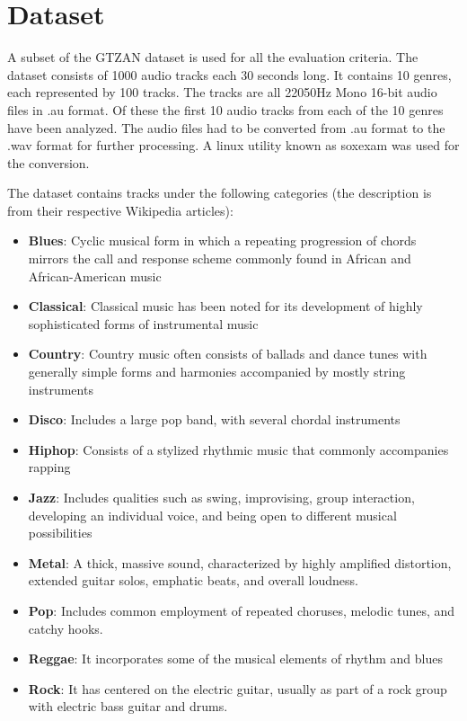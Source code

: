 \documentclass[12pt,journal,compsoc]{IEEEtran}
\begin{document}
\section{Dataset}
A subset of the GTZAN dataset \cite{gtzan} is used for all the evaluation criteria. The dataset consists of 1000 audio tracks each 30 seconds long. It contains 10 genres, each represented by 100 tracks. The tracks are all 22050Hz Mono 16-bit audio files in .au format. Of these the first 10 audio tracks from each of the 10 genres have been analyzed. The audio files had to be converted from .au format to the .wav format for further processing. A linux utility known as soxexam was used for the conversion.

The dataset contains tracks under the following categories (the description is from their respective Wikipedia articles):
\begin{itemize}
\item \textbf{Blues}: Cyclic musical form in which a repeating progression of chords mirrors the call and response scheme commonly found in African and African-American music \cite{blues}
\item \textbf{Classical}: Classical music has been noted for its development of highly sophisticated forms of instrumental music \cite{classical}
\item \textbf{Country}: Country music often consists of ballads and dance tunes with generally simple forms and harmonies accompanied by mostly string instruments \cite{country}
\item \textbf{Disco}: Includes a large pop band, with several chordal instruments \cite{disco}
\item \textbf{Hiphop}: Consists of a stylized rhythmic music that commonly accompanies rapping \cite{hiphop}
\item \textbf{Jazz}: Includes qualities such as swing, improvising, group interaction, developing an individual voice, and being open to different musical possibilities \cite{jazz}
\item \textbf{Metal}: A thick, massive sound, characterized by highly amplified distortion, extended guitar solos, emphatic beats, and overall loudness. \cite{metal}
\item \textbf{Pop}: Includes common employment of repeated choruses, melodic tunes, and catchy hooks. \cite{pop}
\item \textbf{Reggae}: It incorporates some of the musical elements of rhythm and blues \cite{reggae}
\item \textbf{Rock}: It has centered on the electric guitar, usually as part of a rock group with electric bass guitar and drums.\cite{rock}
\end{itemize}
\end{document}
